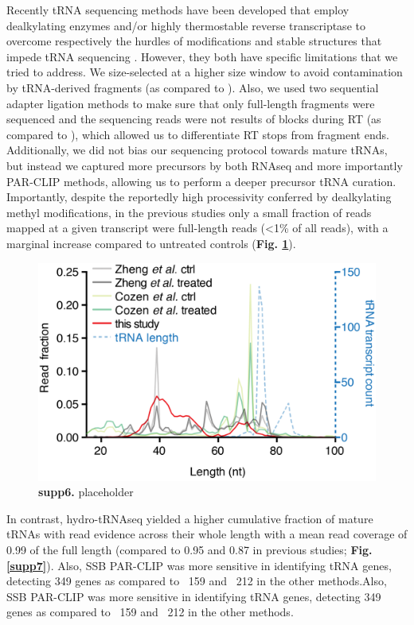 \documentclass[12pt]{rockefeller}
\begin{document}
Recently tRNA sequencing methods have been developed that employ dealkylating enzymes and/or highly thermostable reverse transcriptase to overcome respectively the hurdles of modifications and stable structures that impede tRNA sequencing \cite{Cozen:2015ds, Zheng:2015dw}. However, they both have specific limitations that we tried to address. We size-selected at a higher size window to avoid contamination by tRNA-derived fragments (as compared to \cite{Cozen:2015ds}). Also, we used two sequential adapter ligation methods to make sure that only full-length fragments were sequenced and the sequencing reads were not results of blocks during RT (as compared to \cite{Zheng:2015dw}), which allowed us to differentiate RT stops from fragment ends. Additionally, we did not bias our sequencing protocol towards mature tRNAs, but instead we captured more precursors by both RNAseq and more importantly PAR-CLIP methods, allowing us to perform a deeper precursor tRNA curation. Importantly, despite the reportedly high processivity conferred by dealkylating methyl modifications, in the previous studies only a small fraction of reads mapped at a given transcript were full-length reads (<1\% of all reads), with a marginal increase compared to untreated controls (\textbf{Fig. \ref{supp6}}). 

\begin{figure}[!ht]%
\centering
\includegraphics{supp6.png}%
\caption[supp6]
{\textbf{supp6.}
placeholder}
\centering
\label{supp6}%
\end{figure}

In contrast, hydro-tRNAseq yielded a higher cumulative fraction of mature tRNAs with read evidence across their whole length with a mean read coverage of 0.99 of the full length (compared to 0.95 and 0.87 in previous studies; \textbf{Fig. \ref{supp7}}). Also, SSB PAR-CLIP was more sensitive in identifying tRNA genes, detecting 349 genes as compared to ~159 and ~212 in the other methods.Also, SSB PAR-CLIP was more sensitive in identifying tRNA genes, detecting 349 genes as compared to ~159 and ~212 in the other methods.
\end{document}
